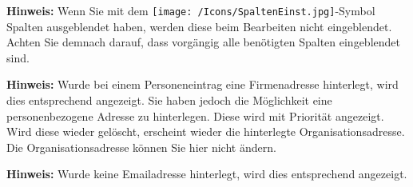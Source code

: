 \textbf{Hinweis:} Wenn Sie mit dem \texttt{[image: /Icons/SpaltenEinst.jpg]}-Symbol Spalten ausgeblendet haben, werden diese beim Bearbeiten nicht eingeblendet. Achten Sie demnach darauf, dass vorgängig alle benötigten Spalten eingeblendet sind.

\vspace{\baselineskip}

\textbf{Hinweis:} Wurde bei einem Personeneintrag eine Firmenadresse hinterlegt, wird dies entsprechend angezeigt. Sie haben jedoch die Möglichkeit eine personenbezogene Adresse zu hinterlegen. Diese wird mit Priorität angezeigt. Wird diese wieder gelöscht, erscheint wieder die hinterlegte Organisationsadresse. Die Organisationsadresse können Sie hier nicht ändern.

\vspace{\baselineskip}

\textbf{Hinweis:} Wurde keine Emailadresse hinterlegt, wird dies entsprechend angezeigt.
